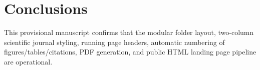 \section{Conclusions}
\label{sec:conclusions}

This provisional manuscript confirms that the modular folder layout, two-column
scientific journal styling, running page headers, automatic numbering of
figures/tables/citations, PDF generation, and public HTML landing page pipeline
are operational.
